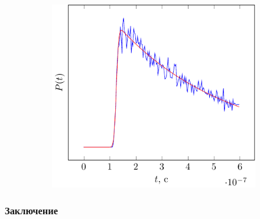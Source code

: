 \documentclass[10pt,pdf,hyperref={unicode}, dvipsnames]{beamer}
\begin{document}
\begin{frame}
\begin{figure}[ht]
\begin{subfigure}{0.42\linewidth}
    \end{subfigure}
    \begin{subfigure}{0.42\linewidth}
        \centering
        \includegraphics[width=\linewidth, page=6]{fig/retracking5}
    \end{subfigure}
    \label{fig:impulse_jason}
\end{figure}
\end{frame}

\begin{frame}

\frametitle{Заключение}
\vskip -3pt
\begin{figure}
\end{figure}
\end{frame}
\end{document}
